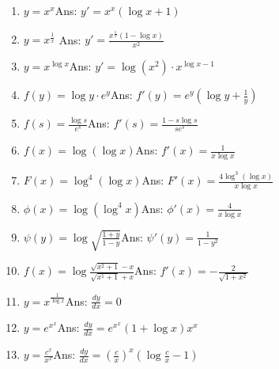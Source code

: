 \begin{enumerate}
\item
$y = x^x$\qquad\qquad\qquad\qquad\qquad\qquad Ans: 	$y' = x^x(\log x + 1)$
\item
$y = x^{\frac{1}{x}}$
\qquad\qquad\qquad\qquad\qquad\qquad Ans: 
$y' = \frac{x^{\frac{1}{x}} (1 - \log x)}{x^2}$

\item
$y = x^{\log x}$\qquad\qquad\qquad\qquad\qquad\qquad Ans: 	$y' = \log (x^2) \cdot x^{\log x - 1}$

\item
$f(y) = \log y \cdot e^y$\qquad\qquad\qquad\qquad\qquad\qquad Ans: 	$f'(y) = e^y \left ( \log y + \frac{1}{y} \right )$

\item
$f(s) = \frac{\log s}{e^s}$\qquad\qquad\qquad\qquad\qquad\qquad Ans: 	$f'(s) = \frac{1 - s \log s}{s e^s}$

\item
$f(x) = \log(\log x)$\qquad\qquad\qquad\qquad\qquad\qquad Ans: 	$f'(x) = \frac{1}{x \log x}$

\item
$F(x) = \log^4(\log x)$\qquad\qquad\qquad\qquad\qquad\qquad Ans: 	$F'(x) = \frac{4 \log^3 (\log x)}{x \log x}$

\item
$\phi (x) = \log(\log^4x)$\qquad\qquad\qquad\qquad\qquad\qquad Ans: 	$\phi'(x) = \frac{4}{x \log x}$

\item
$\psi(y) = \log \sqrt{\frac{1 + y}{1 - y}}$\qquad\qquad\qquad\qquad\qquad\qquad Ans: 	$\psi'(y) = \frac{1}{1 - y^2}$

\item
$f(x) = \log \frac{\sqrt{x^2 + 1} - x}{\sqrt{x^1 + 1} + x}$\qquad\qquad\qquad\qquad\qquad\qquad Ans: 	$f'(x) = -\frac{2}{\sqrt{1 + x^2}}$

\item
$y = x^{\frac{1}{\log x}}$\qquad\qquad\qquad\qquad\qquad\qquad Ans: 	$\frac{dy}{dx} = 0$

\item
$y = e^{x^x}$\qquad\qquad\qquad\qquad\qquad\qquad Ans: 	$\frac{dy}{dx} = e^{x^x}(1 + \log x)x^x$

\item
$y = \frac{c^x}{x^x}$\qquad\qquad\qquad\qquad\qquad\qquad Ans: 	
$\frac{dy}{dx} = \left ( \frac{c}{x} \right )^x \left ( \log \frac{c}{x} - 1 \right )$


\end{enumerate}
